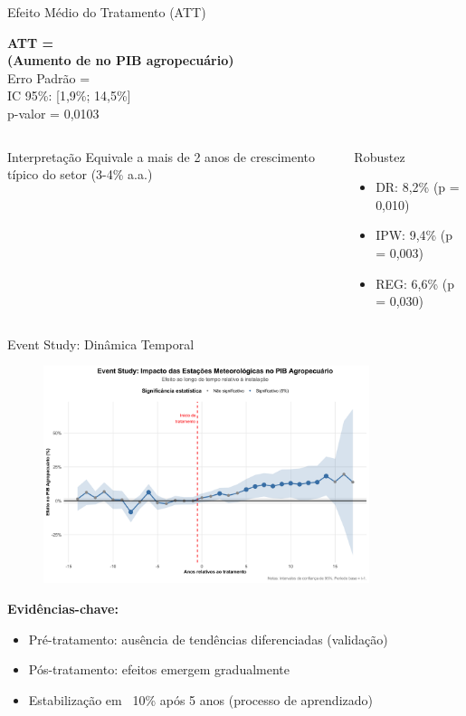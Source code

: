 \documentclass[10pt,aspectratio=169]{beamer}
\begin{document}
\begin{frame}{Efeito Médio do Tratamento (ATT)}
\begin{center}
\huge
\textbf{ATT = \mainatt}\\
\large
\textbf{(Aumento de \mainattpct{} no PIB agropecuário)}\\
\normalsize
\vspace{0.5cm}
Erro Padrão = \mainse\\
IC 95\%: [1,9\%; 14,5\%]\\
p-valor = 0,0103
\end{center}

\vspace{0.5cm}

\begin{columns}
\begin{block}{Interpretação}
Equivale a mais de 2 anos de crescimento típico do setor (3-4\% a.a.)
\end{block}

\begin{block}{Robustez}
\begin{itemize}
    \item DR: 8,2\% (p = 0,010)
    \item IPW: 9,4\% (p = 0,003)
    \item REG: 6,6\% (p = 0,030)
\end{itemize}
\end{block}
\end{columns}
\end{frame}

\begin{frame}{Event Study: Dinâmica Temporal}
\begin{figure}
\centering
\includegraphics[width=0.85\textwidth]{../../../data/outputs/presentation/event_study_enhanced.png}
\end{figure}

\textbf{Evidências-chave:}
\begin{itemize}
    \item Pré-tratamento: ausência de tendências diferenciadas (validação)
    \item Pós-tratamento: efeitos emergem gradualmente
    \item Estabilização em ~10\% após 5 anos (processo de aprendizado)
\end{itemize}
\end{frame}
\end{document}
